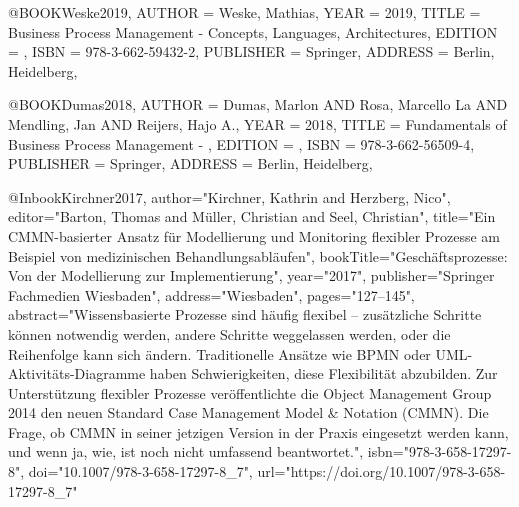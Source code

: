 @BOOK{Weske2019,
	AUTHOR = {Weske, Mathias},
	YEAR = {2019},
	TITLE = {Business Process Management - Concepts, Languages, Architectures},
	EDITION = {},
	ISBN = {978-3-662-59432-2},
	PUBLISHER = {Springer},
	ADDRESS = {Berlin, Heidelberg},
}

@BOOK{Dumas2018,
	AUTHOR = {Dumas, Marlon AND Rosa, Marcello La AND Mendling, Jan AND Reijers, Hajo A.},
	YEAR = {2018},
	TITLE = {Fundamentals of Business Process Management - },
	EDITION = {},
	ISBN = {978-3-662-56509-4},
	PUBLISHER = {Springer},
	ADDRESS = {Berlin, Heidelberg},
}

@Inbook{Kirchner2017,
author="Kirchner, Kathrin
and Herzberg, Nico",
editor="Barton, Thomas
and M{\"u}ller, Christian
and Seel, Christian",
title="Ein CMMN-basierter Ansatz f{\"u}r Modellierung und Monitoring flexibler Prozesse am Beispiel von medizinischen Behandlungsabl{\"a}ufen",
bookTitle="Gesch{\"a}ftsprozesse: Von der Modellierung zur Implementierung",
year="2017",
publisher="Springer Fachmedien Wiesbaden",
address="Wiesbaden",
pages="127--145",
abstract="Wissensbasierte Prozesse sind h{\"a}ufig flexibel -- zus{\"a}tzliche Schritte k{\"o}nnen notwendig werden, andere Schritte weggelassen werden, oder die Reihenfolge kann sich {\"a}ndern. Traditionelle Ans{\"a}tze wie BPMN oder UML-Aktivit{\"a}ts-Diagramme haben Schwierigkeiten, diese Flexibilit{\"a}t abzubilden. Zur Unterst{\"u}tzung flexibler Prozesse ver{\"o}ffentlichte die Object Management Group 2014 den neuen Standard Case Management Model {\&} Notation (CMMN). Die Frage, ob CMMN in seiner jetzigen Version in der Praxis eingesetzt werden kann, und wenn ja, wie, ist noch nicht umfassend beantwortet.",
isbn="978-3-658-17297-8",
doi="10.1007/978-3-658-17297-8_7",
url="https://doi.org/10.1007/978-3-658-17297-8_7"
}

